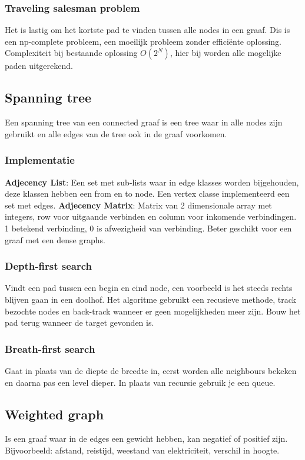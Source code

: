 \subsubsection{Traveling salesman problem}
Het is lastig om het kortste pad te vinden tussen alle nodes in een graaf.
Dis is een np-complete probleem, een moeilijk probleem zonder efficiënte oplossing.
Complexiteit bij bestaande oplossing $O(2^N)$, hier bij worden alle mogelijke paden uitgerekend.

\subsection{Spanning tree}
Een spanning tree van een connected graaf is een tree waar in alle nodes zijn gebruikt en alle edges van de tree ook in de graaf voorkomen.

\subsubsection{Implementatie}
\textbf{Adjecency List}: Een set met sub-lists waar in edge klasses worden bijgehouden, deze klassen hebben een from en to node.
Een vertex classe implementeerd een set met edges.
\textbf{Adjecency Matrix}: Matrix van 2 dimensionale array met integers, row voor uitgaande verbinden en column voor inkomende verbindingen.
1 betekend verbinding, 0 is afwezigheid van verbinding.
Beter geschikt voor een graaf met een dense graphs.

\subsubsection{Depth-first search}
Vindt een pad tussen een begin en eind node, een voorbeeld is het steeds rechts blijven gaan in een doolhof.
Het algoritme gebruikt een recusieve methode, track bezochte nodes en back-track wanneer er geen mogelijkheden meer zijn.
Bouw het pad terug wanneer de target gevonden is.

\subsubsection{Breath-first search}
Gaat in plaats van de diepte de breedte in, eerst worden alle neighbours bekeken en daarna pas een level dieper.
In plaats van recursie gebruik je een queue.

\subsection{Weighted graph}
Is een graaf waar in de edges een gewicht hebben, kan negatief of positief zijn.
Bijvoorbeeld: afstand, reistijd, weestand van elektriciteit, verschil in hoogte.

